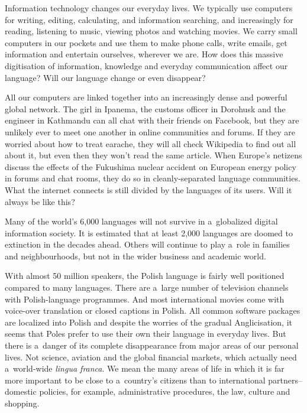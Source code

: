 \begin{multicols}{2} 

Information technology changes our everyday lives. We typically use
computers for writing, editing, calculating, and information
searching, and increasingly for reading, listening to music, viewing
photos and watching movies. We carry small computers in our pockets
and use them to make phone calls, write emails, get information and
entertain ourselves, wherever we are. How does this massive
digitisation of information, knowledge and everyday communication
affect our language? Will our language change or even disappear? 

All our computers are linked together into an increasingly dense and
powerful global network. The girl in Ipanema, the customs officer in
Dorohusk and the engineer in Kathmandu can all chat with their friends
on Facebook, but they are unlikely ever to meet one another in online
communities and forums. If they are worried about how to treat
earache, they will all check Wikipedia to find out all about it, but
even then they won’t read the same article. When Europe's netizens
discuss the effects of the Fukushima nuclear accident on European
energy policy in forums and chat rooms, they do so in
cleanly-separated language communities. What the internet connects is
still divided by the languages of its users. Will it always be like
this? 

Many of the world’s 6,000 languages will not survive in a~globalized
digital information society. It is estimated that at least 2,000
languages are doomed to extinction in the decades ahead. Others will
continue to play a~role in families and neighbourhoods, but not in the
wider business and academic world. 

With almost 50 million speakers, the Polish language is fairly well
positioned compared to many languages. There are a~large number of
television channels with Polish-language programmes. And most
international movies come with voice-over translation or closed
captions in Polish. All common software packages are localized into
Polish and despite the worries of the gradual Anglicisation, it seems
that Poles prefer to use their own their language in everyday lives.
But there is a~danger of its complete disappearance from major areas
of our personal lives. Not science, aviation and the global financial
markets, which actually need a~world-wide \textit{lingua franca}. We
mean the many areas of life in which it is far more important to be
close to a~country’s citizens than to international
partners--domestic policies, for example, administrative procedures,
the law, culture and shopping. 


\end{multicols}

